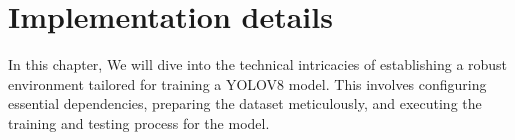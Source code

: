 \documentclass[12 pt]{report}
\begin{document}



\newpage
\chapter{Implementation details}
\justify
In this chapter, We will dive into the technical intricacies of establishing a robust environment tailored for training a YOLOV8 model. This involves configuring essential dependencies, preparing the dataset meticulously, and executing the training and testing process for the model.
\end{document}
